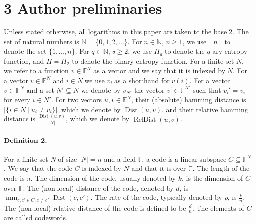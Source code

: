 \section*{3 Author preliminaries}
Unless stated otherwise, all logarithms in this paper are taken to the base 2. The set of natural numbers is $\mathbb N=\{0,1,2,\ldots\}$. For $n\in\mathbb N$, $n\ge1$, we use $[n]$ to denote the set $\{1,\ldots,n\}$. For $q\in\mathbb N$, $q\ge2$, we use $H_q$ to denote the $q$-ary entropy function, and $H=H_2$ to denote the binary entropy function.
For a finite set $N$, we refer to a function $v\in\mathbb F^N$ as a vector and we say that it is indexed by $N$. For a vector $v\in\mathbb F^N$ and $i\in N$ we use $v_i$ as a shorthand for $v(i)$. For a vector $v\in\mathbb F^N$ and a set $N'\subseteq N$ we denote by $v_{N'}$ the vector $v'\in\mathbb F^{N'}$ such that $v_i'=v_i$ for every $i\in N'$. For two vectors $u,v\in\mathbb F^N$, their (absolute) hamming distance is $|\{i\in N\mid u_i\ne v_i\}|$, which we denote by $\operatorname{Dist}(u,v)$, and their relative hamming distance is $\frac{\operatorname{Dist}(u,v)}{|N|}$, which we denote by $\operatorname{RelDist}(u,v)$.
\paragraph{Definition 2.} For a finite set $N$ of size $|N|=n$ and a field $\mathbb F$, a code is a linear subspace $C\subseteq\mathbb F^N$. We say that the code $C$ is indexed by $N$ and that it is over $\mathbb F$. The length of the code is $n$. The dimension of the code, usually denoted by $k$, is the dimension of $C$ over $\mathbb F$. The (non-local) distance of the code, denoted by $d$, is $\min_{c,c'\in C,c\ne c'}\operatorname{Dist}(c,c')$. The rate of the code, typically denoted by $\rho$, is $\frac kn$. The (non-local) relative-distance of the code is defined to be $\frac dn$. The elements of $C$ are called codewords.
